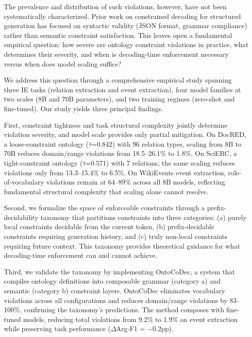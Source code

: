 \documentclass[11pt,a4paper]{article}
\begin{document}
The prevalence and distribution of such violations, however, have not been systematically characterized. Prior work on constrained decoding for structured generation has focused on syntactic validity (JSON format, grammar compliance) rather than semantic constraint satisfaction. This leaves open a fundamental empirical question: how severe are ontology constraint violations in practice, what determines their severity, and when is decoding-time enforcement necessary versus when does model scaling suffice?

We address this question through a comprehensive empirical study spanning three IE tasks (relation extraction and event extraction), four model families at two scales (8B and 70B parameters), and two training regimes (zero-shot and fine-tuned). Our study yields three principal findings.

First, constraint tightness and task structural complexity jointly determine violation severity, and model scale provides only partial mitigation. On DocRED, a loose-constraint ontology ($\bar{\tau}$=0.842) with 96 relation types, scaling from 8B to 70B reduces domain/range violations from 18.5--26.1\% to 1.8\%. On SciERC, a tight-constraint ontology ($\bar{\tau}$=0.571) with 7 relations, the same scaling reduces violations only from 13.3--15.4\% to 6.5\%. On WikiEvents event extraction, role-of-vocabulary violations remain at 64--89\% across all 8B models, reflecting fundamental structural complexity that scaling alone cannot resolve.

Second, we formalize the space of enforceable constraints through a prefix-decidability taxonomy that partitions constraints into three categories: (a) purely local constraints decidable from the current token, (b) prefix-decidable constraints requiring generation history, and (c) truly non-local constraints requiring future context. This taxonomy provides theoretical guidance for what decoding-time enforcement can and cannot achieve.

Third, we validate the taxonomy by implementing OntoCoDec, a system that compiles ontology definitions into composable grammar (category a) and semantic (category b) constraint layers. OntoCoDec eliminates vocabulary violations across all configurations and reduces domain/range violations by 83--100\%, confirming the taxonomy's predictions. The method composes with fine-tuned models, reducing total violations from 9.2\% to 1.9\% on event extraction while preserving task performance ($\Delta$Arg-F1 = $-$0.2pp).
\end{document}
